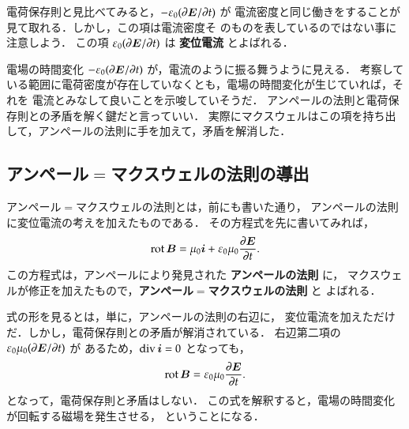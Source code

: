         電荷保存則と見比べてみると，$- \varepsilon_{0}(\partial \boldsymbol{E}/\partial t)$ が
        電流密度と同じ働きをすることが見て取れる．しかし，この項は電流密度そ
        のものを表しているのではない事に注意しよう．
        この項 $\varepsilon_{0}(\partial \boldsymbol{E}/\partial t)$ は \textbf{変位電流} とよばれる．

        電場の時間変化 $- \varepsilon_{0}(\partial \boldsymbol{E}/\partial t)$ が，電流のように振る舞うように見える．
        考察している範囲に電荷密度が存在していなくとも，電場の時間変化が生じていれば，それを
        電流とみなして良いことを示唆していそうだ．
        アンペールの法則と電荷保存則との矛盾を解く鍵だと言っていい．
        実際にマクスウェルはこの項を持ち出して，アンペールの法則に手を加えて，矛盾を解消した．

    \subsection{アンペール$=$マクスウェルの法則の導出}
        アンペール$=$マクスウェルの法則とは，前にも書いた通り，
        アンペールの法則に変位電流の考えを加えたものである．
        その方程式を先に書いてみれば，
        \begin{align}
            \mathrm{rot}\, \boldsymbol{B}
                =   \mu_{0} \boldsymbol{i}
                  + \varepsilon_{0} \mu_{0} \frac{\partial \boldsymbol{E}}{\partial t}.
        \end{align}
        この方程式は，アンペールにより発見された \textbf{アンペールの法則} に，
        マクスウェルが修正を加えたもので，\textbf{アンペール$=$マクスウェルの法則} と
        よばれる．

        式の形を見るとは，単に，アンペールの法則の右辺に，
        変位電流を加えただけだ．しかし，電荷保存則との矛盾が解消されている．
        右辺第二項の $\varepsilon_{0} \mu_{0} (\partial \boldsymbol{E}/\partial t)$ が
        あるため，$\mathrm{div}\, \boldsymbol{i}=0$ となっても，
                \begin{equation*}
            \mathrm{rot}\, \boldsymbol{B} = \varepsilon_{0} \mu_{0} \frac{\partial \boldsymbol{E}}{\partial t}.
                \end{equation*}
        となって，電荷保存則と矛盾はしない．
        この式を解釈すると，電場の時間変化が回転する磁場を発生させる，
        ということになる．

